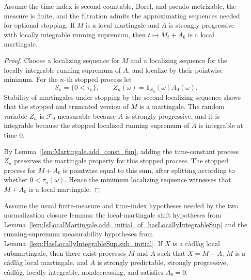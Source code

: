 \begin{lemma}

  \label{lem:IsLocalMartingale.add_initial_of_hasLocallyIntegrableSup}
Assume the time index is second countable, Borel, and pseudo-metrizable,
the measure is finite, and the filtration admits the approximating
sequences needed for optional stopping.  If \(M\) is a local martingale
and \(A\) is strongly progressive with locally integrable running
supremum, then \(t\mapsto M_t+A_0\) is a local martingale.
\end{lemma}

\begin{proof}

\leanok
Choose a localizing sequence for \(M\) and a localizing sequence for the
locally integrable running supremum of \(A\), and localize by their
pointwise minimum.  For the \(n\)-th stopped process let
\[
  S_n=\{0<\tau_n\}, \qquad
  Z_n(\omega)=\mathbf 1_{S_n}(\omega)A_0(\omega).
\]
Stability of martingales under stopping by the second localizing sequence
shows that the stopped and truncated version of \(M\) is a martingale.
The random variable \(Z_n\) is \(\mathcal F_0\)-measurable because \(A\)
is strongly progressive, and it is integrable because the stopped
localized running supremum of \(A\) is integrable at time \(0\).

By Lemma~\ref{lem:Martingale.add_const_fun}, adding the time-constant
process \(Z_n\) preserves the martingale property for this stopped
process.  The stopped process for \(M+A_0\) is pointwise equal to this
sum, after splitting according to whether \(0<\tau_n(\omega)\).  Hence
the minimum localizing sequence witnesses that \(M+A_0\) is a local
martingale.
\end{proof}

\begin{theorem}\label{thm:local_doobMeyer_normalized}
Assume the usual finite-measure and time-index hypotheses needed by the
two normalization closure lemmas: the local-martingale shift hypotheses
from Lemma~\ref{lem:IsLocalMartingale.add_initial_of_hasLocallyIntegrableSup}
and the running-supremum measurability hypotheses from
Lemma~\ref{lem:HasLocallyIntegrableSup.sub_initial}.  If \(X\) is a
càdlàg local submartingale, then there exist processes \(M\) and \(A\)
such that \(X=M+A\), \(M\) is a càdlàg local martingale, and \(A\) is
strongly predictable, strongly progressive, càdlàg, locally integrable,
nondecreasing, and satisfies \(A_0=0\).
\end{theorem}

